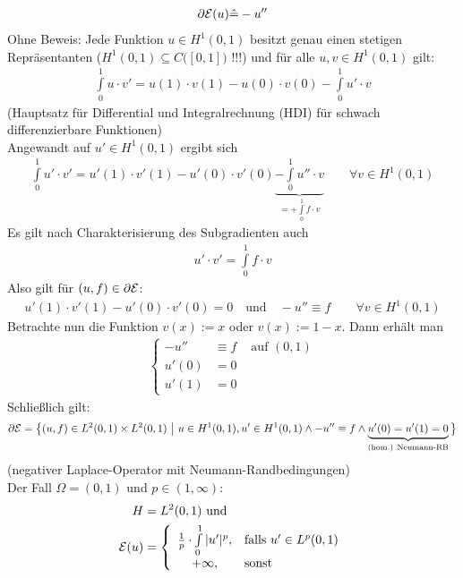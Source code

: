 \begin{beispiel}
\begin{align*}
\partial\mathcal{E}(u)\hat{=}-u''
\end{align*}
Ohne Beweis: Jede Funktion $u\in H^1(0,1)$ besitzt genau einen stetigen Repräsentanten ($H^1(0,1)\subseteq C\big([0,1]\big)$ !!!) und für alle $u,v\in H^1(0,1)$ gilt:
\begin{align*}
\int\limits_0^1 u\cdot v'=u(1)\cdot v(1)-u(0)\cdot v(0)-\int\limits_0^1 u'\cdot v
\end{align*} 
(Hauptsatz für Differential und Integralrechnung (HDI) für schwach differenzierbare Funktionen)\\
Angewandt auf $u'\in H^1(0,1)$ ergibt sich 
\begin{align*}
\int\limits_0^1 u'\cdot v'=u'(1)\cdot v'(1)-u'(0)\cdot v'(0)\underbrace{-\int\limits_0^1 u''\cdot v}_{=+\int\limits_0^1 f\cdot v}\qquad\forall v\in H^1(0,1)
\end{align*}
Es gilt nach Charakterisierung des Subgradienten auch 
\begin{align*}
u'\cdot v'=\int\limits_0^1 f\cdot v
\end{align*}
Also gilt für $(u,f)\in \partial\mathcal{E}$:
\begin{align*}
u'(1)\cdot v'(1)-u'(0)\cdot v'(0)=0\quad\text{und}\quad -u''\equiv f
\qquad\forall v\in H^1(0,1)
\end{align*}
Betrachte nun die Funktion $v(x):=x$ oder $v(x):=1-x$. Dann erhält man 
\begin{align*}
\left\lbrace\begin{array}{rll}
-u'' &\equiv f &\text{ auf }(0,1)\\
u'(0)&=0\\
u'(1)&=0
\end{array}\right.
\end{align*}
Schließlich gilt:
\begin{align*}
\partial\mathcal{E}=\big\lbrace(u,f)\in L^2(0,1)\times L^2(0,1)~\big|~u\in H^1(0,1),u'\in H^1(0,1)\wedge -u''\equiv f\wedge \underbrace{u'(0)=u'(1)=0}_{\text{(hom.) Neumann-RB}}\big\rbrace
\end{align*}
(negativer Laplace-Operator mit Neumann-Randbedingungen)\\
Der Fall $\Omega=(0,1)$ und $p\in(1,\infty)$:
\begin{align*}
H&=L^2(0,1)\text{ und }\\
\E(u)&=\left\lbrace\begin{array}{cl}
\frac{1}{p}\cdot\int\limits_0^1 |u'|^p, &\falls u'\in L^p(0,1)\\
+\infty, &\sonst
\end{array}\right.\\

\end{align*}
\end{beispiel}
